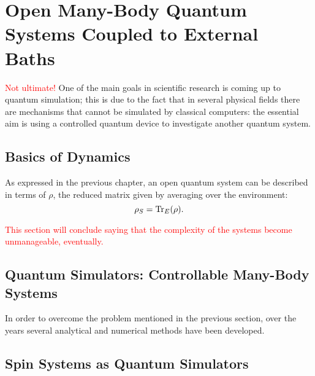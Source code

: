 
\chapter{Open Many-Body Quantum Systems Coupled to External Baths}
\textcolor{red}{Not ultimate!}
One of the main goals in scientific research is coming up to quantum simulation; this is due to the fact that in several physical fields there are mechanisms that cannot be simulated by classical computers: the essential aim is using a controlled quantum device to investigate another quantum system.

\section{Basics of Dynamics}
As expressed in the previous chapter, an open quantum system can be described in terms of $\rho$, the reduced matrix given by averaging over the environment: 
\begin{equation}
    \rho_S = \operatorname{Tr}_E(\rho).
\end{equation}

\textcolor{red}{This section will conclude saying that the complexity of the systems become unmanageable, eventually.}

\section{Quantum Simulators: Controllable Many-Body Systems}
In order to overcome the problem mentioned in the previous section, over the years several analytical and numerical methods have been developed. 

\section{Spin Systems as Quantum Simulators}
